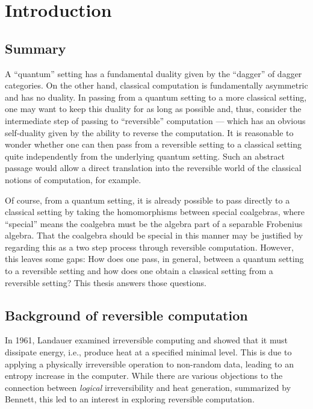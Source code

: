 \chapter{Introduction}\label{chap:introduction}
\section{Summary}\label{sec:summary}
A ``quantum'' setting has a fundamental duality given by the ``dagger'' of dagger
categories\cite{selinger05:dagger,abramsky05:abstractscalars}. On the other hand, classical
computation is fundamentally asymmetric and has no duality. In passing from a quantum setting to a more classical setting, one
may want to keep this duality for as long as possible and, thus, consider the intermediate step of
passing to ``reversible'' computation --- which has an obvious self-duality given by the ability to
reverse the computation. It is reasonable to
wonder whether one can then pass from a reversible setting to a classical setting quite
independently from the underlying quantum setting. Such an abstract
passage would allow a direct translation into the reversible world of the classical notions of
computation, for example.

Of course, from a quantum setting, it is already possible to pass directly to a classical setting by
taking the homomorphisms between special coalgebras, where ``special'' means the coalgebra must be
the algebra part of a separable Frobenius algebra. That the coalgebra should be special in this manner
may be justified by regarding this as a two step process through reversible computation. However,
this leaves some gaps: How does one pass, in general, between a quantum setting to a reversible
setting and how does one obtain a classical setting from a reversible setting? This thesis answers
those questions.
\section{Background of reversible computation}
\label{sec:background}

In 1961, Landauer\cite{landauer1961irreversibility} examined irreversible computing
and showed that it must dissipate energy, i.e., produce heat at a specified minimal level. This is
due to applying a physically irreversible operation to non-random data, leading to an entropy
increase in the computer. While there are various objections to the connection between
\emph{logical} irreversibility and heat generation, summarized by Bennett\cite{bennett2003notes},
this led to an interest in exploring reversible computation.

